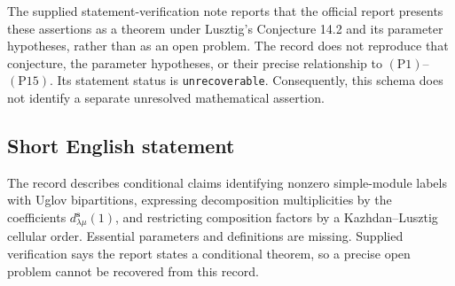 \documentclass[11pt]{article}
\begin{document}
The supplied statement-verification note reports that the official report presents these assertions as a theorem under Lusztig's Conjecture 14.2 and its parameter hypotheses, rather than as an open problem. The record does not reproduce that conjecture, the parameter hypotheses, or their precise relationship to \((\mathrm P1)\)--\((\mathrm P15)\). Its statement status is \texttt{unrecoverable}. Consequently, this schema does not identify a separate unresolved mathematical assertion.
\subsection{Short English statement}
The record describes conditional claims identifying nonzero simple-module labels with Uglov bipartitions, expressing decomposition multiplicities by the coefficients \(d^{\mathbf s}_{\lambda\mu}(1)\), and restricting composition factors by a Kazhdan--Lusztig cellular order. Essential parameters and definitions are missing. Supplied verification says the report states a conditional theorem, so a precise open problem cannot be recovered from this record.
\end{document}
